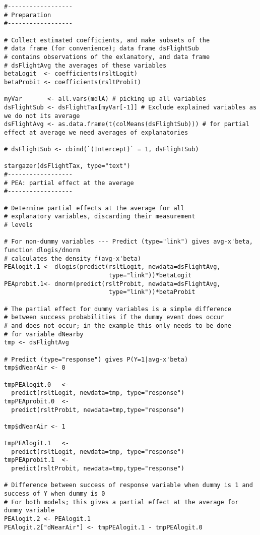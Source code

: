\documentclass{article}
\begin{document}
\begin{tiny}
\begin{verbatim}
#------------------
# Preparation
#------------------

# Collect estimated coefficients, and make subsets of the
# data frame (for convenience); data frame dsFlightSub
# contains observations of the exlanatory, and data frame
# dsFlightAvg the averages of these variables
betaLogit  <- coefficients(rsltLogit)
betaProbit <- coefficients(rsltProbit)

myVar       <- all.vars(mdlA) # picking up all variables
dsFlightSub <- dsFlightTax[myVar[-1]] # Exclude explained variables as we do not its average
dsFlightAvg <- as.data.frame(t(colMeans(dsFlightSub))) # for partial effect at average we need averages of explanatories

# dsFlightSub <- cbind(`(Intercept)` = 1, dsFlightSub)

stargazer(dsFlightTax, type="text")
#------------------
# PEA: partial effect at the average
#------------------

# Determine partial effects at the average for all
# explanatory variables, discarding their measurement 
# levels

# For non-dummy variables --- Predict (type="link") gives avg-x'beta, function dlogis/dnorm
# calculates the density f(avg-x'beta)
PEAlogit.1 <- dlogis(predict(rsltLogit, newdata=dsFlightAvg,
                             type="link"))*betaLogit
PEAprobit.1<- dnorm(predict(rsltProbit, newdata=dsFlightAvg,
                             type="link"))*betaProbit

# The partial effect for dummy variables is a simple difference
# between success probabilities if the dummy event does occur
# and does not occur; in the example this only needs to be done
# for variable dNearby
tmp <- dsFlightAvg

# Predict (type="response") gives P(Y=1|avg-x'beta)
tmp$dNearAir <- 0

tmpPEAlogit.0   <- 
  predict(rsltLogit, newdata=tmp, type="response")
tmpPEAprobit.0  <- 
  predict(rsltProbit, newdata=tmp,type="response")

tmp$dNearAir <- 1

tmpPEAlogit.1   <- 
  predict(rsltLogit, newdata=tmp, type="response")
tmpPEAprobit.1  <- 
  predict(rsltProbit, newdata=tmp,type="response")

# Difference between success of response variable when dummy is 1 and success of Y when dummy is 0
# For both models; this gives a partial effect at the average for dummy variable
PEAlogit.2 <- PEAlogit.1
PEAlogit.2["dNearAir"] <- tmpPEAlogit.1 - tmpPEAlogit.0


\end{verbatim}
\end{tiny}
\end{document}
